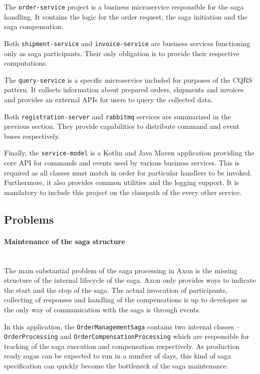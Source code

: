 \documentclass[oneside,
  digital, %
  table,   %
  lof,     %
  lot,     %
]{fithesis3}
\newcommand{\newlinepar}[1]{\paragraph{#1}\needspace{4\baselineskip}\mbox{}\\}
\begin{document}
The \texttt{order-service} project is a business microservice responsible for the saga handling. It contains the logic for the order request, the saga initiation and the saga compensation.

Both \texttt{shipment-service} and \texttt{invoice-service} are business services functioning only as saga participants. Their only obligation is to provide their respective computations.

The \texttt{query-service} is a specific microservice included for purposes of the CQRS pattern. It collects information about prepared orders, shipments and invoices and provides an external APIs for users to query the collected data. 

Both \texttt{registration-server} and \texttt{rabbitmq} services are summarized in the previous section. They provide capabilities to distribute command and event buses respectively.

Finally, the \texttt{service-model} is a Kotlin and Java Maven application providing the core API for commands and events used by various business services. This is required as all classes must match in order for particular handlers to be invoked. Furthermore, it also provides common utilities and the logging support. It is mandatory to include this project on the classpath of the every other service.

\hfill \break

\subsection{Problems}
\label{sec:axon-problems}

\newlinepar{Maintenance of the saga structure}

The main substantial problem of the saga processing in Axon is the missing structure of the internal lifecycle of the saga. Axon only provides ways to indicate the start and the stop of the saga. The actual invocation of participants, collecting of responses and handling of the compensations is up to developer as the only way of communication with the saga is through events.

In this application, the \texttt{OrderManagementSaga} contains two internal classes -- \texttt{OrderProcessing} and \texttt{OrderCompensationProcessing} which are responsible for tracking of the saga execution and compensation respectively. As production ready sagas can be expected to run in a number of days, this kind of saga specification can quickly become the bottleneck of the saga maintenance.
\end{document}
